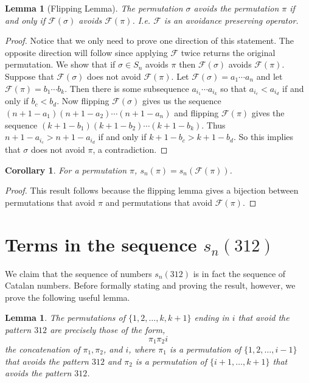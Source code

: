 \documentclass[11pt,letterpaper,twoside,english]{article}
\theoremstyle{theorem}
\newtheorem{corollary}[theorem]{Corollary}
\newtheorem{lemma}[theorem]{Lemma}
\theoremstyle{remark}
\begin{document}
\begin{lemma}[Flipping Lemma]
The permutation $\sigma$ avoids the permutation $\pi$ if and only if $\mathcal{F}(\sigma)$ avoids $\mathcal{F}(\pi)$. I.e. $\mathcal{F}$ is an avoidance preserving operator. 
\end{lemma}
\begin{proof}
Notice that we only need to prove one direction of this statement. The opposite direction will follow since applying $\mathcal{F}$ twice returns the original permutation. We show that if ${\sigma}\in S_n$ avoids $\pi$ then $\mathcal{F}(\sigma)$ avoids $\mathcal{F}(\pi)$. Suppose that $\mathcal{F}(\sigma)$ does not avoid $\mathcal{F}(\pi)$. Let $\mathcal{F}(\sigma)=a_1\cdots a_n$ and let $\mathcal{F}(\pi)=b_1\cdots  b_k$. Then there is some subsequence $a_{i_1}\cdots a_{i_k}$ so that $a_{i_c}<a_{i_d}$ if and only if $b_c<b_d$. Now flipping $\mathcal{F}(\sigma)$ gives us the sequence $(n+1-a_1)(n+1-a_2)\cdots(n+1-a_n)$ and flipping $\mathcal{F}(\pi)$ gives the sequence $(k+1-b_1)(k+1-b_2)\cdots(k+1-b_k)$. Thus $n+1-a_{i_c}>n+1-a_{i_d}$ if and only if $k+1-b_c>k+1-b_d$. So  this implies that $\sigma$ does not avoid $\pi$, a contradiction. 
\end{proof}

\begin{corollary} 
For a permutation $\pi$, $s_n(\pi)=s_n(\mathcal{F}(\pi))$. 
\end{corollary}
\begin{proof}
This result follows because the flipping lemma gives a bijection between permutations that avoid $\pi$ and permutations that avoid $\mathcal{F}(\pi)$. 
\end{proof}
\section{Terms in the sequence $s_n(312)$}
\label{312}

We claim that the sequence of numbers $s_n(312)$ is in fact the sequence of Catalan numbers. Before formally stating and proving the result, however, we prove the following useful lemma.
\begin{lemma}
\label{lemma1}
The permutations of $\{1,2,\dots,k,k+1\}$ ending in $i$ that avoid the pattern $312$ are precisely those of the form,
$$\pi_1 \pi_2 i$$
the concatenation of $\pi_1, \pi_2$, and $i$, where $\pi_1$ is a permutation of $\{1,2,\ldots,i-1\}$ that avoids the pattern $312$ and $\pi_2$ is a permutation of $\{i+1,\ldots,k+1\}$ that avoids the pattern $312$.
\end{lemma}
\end{document}
